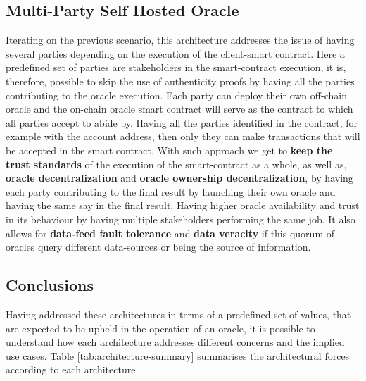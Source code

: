 \subsection{Multi-Party Self Hosted Oracle}\label{MP-SHO}
Iterating on the previous scenario, this architecture addresses the issue of having several parties depending on the execution of the client-smart contract. Here a predefined set of parties are stakeholders in the smart-contract execution, it is, therefore, possible to skip the use of authenticity proofs by having all the parties contributing to the oracle execution. Each party can deploy their own off-chain oracle and the on-chain oracle smart contract will serve as the contract to which all parties accept to abide by. Having all the parties identified in the contract, for example with the account address, then only they can make transactions that will be accepted in the smart contract. With such approach we get to \textbf{keep the trust standards} of the execution of the smart-contract as a whole, as well as, \textbf{oracle decentralization} and \textbf{oracle ownership decentralization}, by having each party contributing to the final result by launching their own oracle and having the same say in the final result. Having higher oracle availability and trust in its behaviour by having multiple stakeholders performing the same job. It also allows for \textbf{data-feed fault tolerance} and \textbf{data veracity} if this quorum of oracles query different data-sources or being the source of information.

\subsection{Conclusions}
Having addressed these architectures in terms of a predefined set of values, that are expected to be upheld in the operation of an oracle, it is possible to understand how each architecture addresses different concerns and the implied use cases. Table \ref{tab:architecture-summary} summarises the architectural forces according to each architecture.


